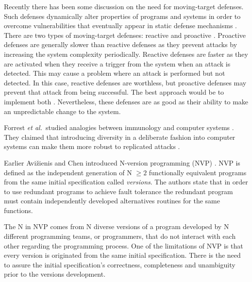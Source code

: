 \documentclass{sig-alternate-05-2015}
\begin{document}
Recently there has been some discussion on the need for moving-target defenses. Such defenses dynamically alter properties of programs and systems in order to overcome vulnerabilities that eventually appear in static defense mechanisms \cite{Evans2011}.
There are two types of moving-target defenses: reactive and proactive \cite{Carvalho2014}. Proactive defenses are generally slower than reactive defenses as they prevent attacks by increasing the system complexity periodically. Reactive defenses are faster as they are activated when they receive a trigger from the system when an attack is detected. This may cause a problem where an attack is performed but  not detected. In this case, reactive defenses are worthless, but  proactive defenses may prevent that attack from being successful.
The best approach would be to implement both \cite{Sousa:10}.
Nevertheless, these defenses are  as good as their ability to make an unpredictable change to the system.

Forrest \emph{et al.}~studied analogies between immunology and computer systems \cite{Forrest1997}.
They claimed that introducing diversity in a deliberate fashion into computer systems can make them more robust to replicated attacks \cite{Forrest:1997:BDC:822075.822408}.


Earlier Avi\v{z}ienis and Chen introduced N-version programming (NVP) \cite{Avizienis77n-version}. NVP is defined as the independent generation of N $\geq 2$ functionally equivalent programs from the same initial specification called \textit{versions}.
%
The authors state that in order to use redundant programs to achieve fault tolerance 
the redundant program must contain independently developed alternatives routines for the same functions.

The N in NVP comes from  N diverse versions of a program developed by N different programming teams, or programmers, that do not interact with each other regarding the programming process.
One of the limitations of NVP is that every version is originated from the same initial specification. There is the need to assure the initial specification's correctness, completeness and unambiguity prior to the versions development.
\end{document}
